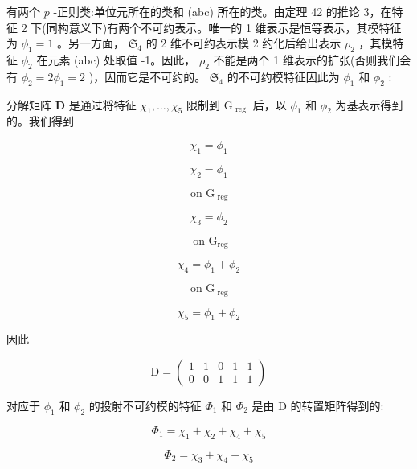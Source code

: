 \documentclass[10pt]{article}
\begin{document}
有两个 \(p\) -正则类:单位元所在的类和 (abc) 所在的类。由定理 42 的推论 3，在特征 2 下(同构意义下)有两个不可约表示。唯一的 1 维表示是恒等表示，其模特征为 \({\phi }_{1} = 1\) 。另一方面， \({\mathfrak{S}}_{4}\) 的 2 维不可约表示模 2 约化后给出表示 \({\rho }_{2}\) ，其模特征 \({\phi }_{2}\) 在元素 (abc) 处取值 -1。因此， \({\rho }_{2}\) 不能是两个 1 维表示的扩张(否则我们会有 \({\phi }_{2} = 2{\phi }_{1} = 2\) )，因而它是不可约的。 \({\mathfrak{S}}_{4}\) 的不可约模特征因此为 \({\phi }_{1}\) 和 \({\phi }_{2}\) :

\begin{center}
\end{center}

分解矩阵 \(\mathbf{D}\) 是通过将特征 \({\chi }_{1},\ldots ,{\chi }_{5}\) 限制到 \({\mathrm{G}}_{\text{ reg }}\) 后，以 \({\phi }_{1}\) 和 \({\phi }_{2}\) 为基表示得到的。我们得到

\[
{\chi }_{1} = {\phi }_{1}
\]

\[
{\chi }_{2} = {\phi }_{1}
\]

\[
\text{ on }{\mathrm{G}}_{\text{ reg }}
\]

\[
{\chi }_{3} = {\phi }_{2}
\]

\[
\text{ on }{\mathrm{G}}_{\mathrm{{reg}}}
\]

\[
{\chi }_{4} = {\phi }_{1} + {\phi }_{2}
\]

\[
\text{ on }{\mathrm{G}}_{\text{ reg }}
\]

\[
{\chi }_{5} = {\phi }_{1} + {\phi }_{2}
\]

因此

\[
\mathrm{D} = \left( \begin{array}{lllll} 1 & 1 & 0 & 1 & 1 \\  0 & 0 & 1 & 1 & 1 \end{array}\right)
\]

对应于 \({\phi }_{1}\) 和 \({\phi }_{2}\) 的投射不可约模的特征 \({\Phi }_{1}\) 和 \({\Phi }_{2}\) 是由 D 的转置矩阵得到的:

\[
{\Phi }_{1} = {\chi }_{1} + {\chi }_{2} + {\chi }_{4} + {\chi }_{5}
\]

\[
{\Phi }_{2} = {\chi }_{3} + {\chi }_{4} + {\chi }_{5}
\]
\end{document}
